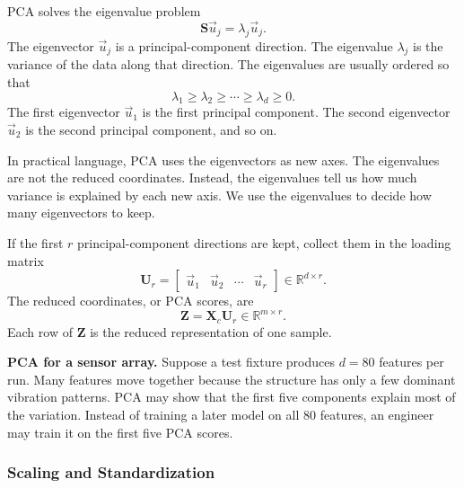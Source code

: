 \documentclass[12pt,letter]{article}
\newcommand{\mat}[1]{\mathbf{#1}}
\newcommand{\vct}[1]{\vec{#1}}
\begin{document}
PCA solves the eigenvalue problem
\begin{equation}
    \mat{S}\vct{u}_j
    =
    \lambda_j\vct{u}_j.
    \label{eq:dimred_pca_eigenproblem}
\end{equation}
The eigenvector $\vct{u}_j$ is a principal-component direction. The eigenvalue $\lambda_j$ is the variance of the data along that direction. The eigenvalues are usually ordered so that
\begin{equation}
    \lambda_1\geq \lambda_2\geq \cdots \geq \lambda_d\geq 0.
    \label{eq:dimred_ordered_eigenvalues}
\end{equation}
The first eigenvector $\vct{u}_1$ is the first principal component. The second eigenvector $\vct{u}_2$ is the second principal component, and so on.

In practical language, PCA uses the eigenvectors as new axes. The eigenvalues are not the reduced coordinates. Instead, the eigenvalues tell us how much variance is explained by each new axis. We use the eigenvalues to decide how many eigenvectors to keep.

If the first $r$ principal-component directions are kept, collect them in the loading matrix
\begin{equation}
    \mat{U}_{r}
    =
    \begin{bmatrix}
    \vct{u}_1 & \vct{u}_2 & \cdots & \vct{u}_r
    \end{bmatrix}
    \in\mathbb{R}^{d\times r}.
    \label{eq:dimred_loading_matrix}
\end{equation}
The reduced coordinates, or PCA scores, are
\begin{equation}
    \mat{Z}
    =
    \mat{X}_{c}\mat{U}_{r}
    \in\mathbb{R}^{m\times r}.
    \label{eq:dimred_pca_scores}
\end{equation}
Each row of $\mat{Z}$ is the reduced representation of one sample.

\begin{example}
\textbf{PCA for a sensor array.} Suppose a test fixture produces $d=80$ features per run. Many features move together because the structure has only a few dominant vibration patterns. PCA may show that the first five components explain most of the variation. Instead of training a later model on all 80 features, an engineer may train it on the first five PCA scores.
\end{example}

\subsubsection{Scaling and Standardization}
\end{document}
